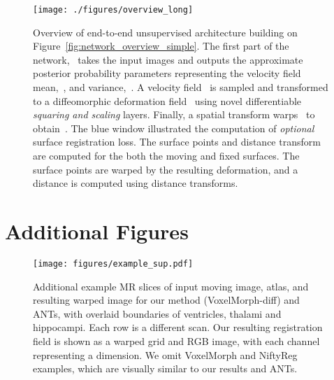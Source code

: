 \documentclass{article}
\begin{document}
\begin{figure*}[h!]
	\centering
	\begin{center}
		\texttt{[image: ./figures/overview\_long]}
	\end{center}
	\hfill
	\vspace{-0.75cm}
	\begin{minipage}[b]{1\linewidth}
		\caption{ Overview of end-to-end unsupervised architecture building on Figure~\ref{fig:network_overview_simple}. The first part of the network,~ takes the input images and outputs the approximate posterior probability parameters representing the velocity field mean,~, and variance,~. A velocity field~ is sampled and transformed to a diffeomorphic deformation field~ using novel differentiable \textit{squaring and scaling} layers. Finally, a spatial transform warps~ to obtain~. The blue window illustrated the computation of \textit{optional} surface registration loss. The surface points and distance transform are computed for the both the moving and fixed surfaces. The surface points are warped by the resulting deformation, and a distance is computed using distance transforms.
		}
		\label{fig:sup:network_overview_simple}
	\end{minipage}
\end{figure*}






\clearpage
\twocolumn

\section*{Additional Figures}





\begin{figure}[h!]
\begin{center}
		\texttt{[image: figures/example\_sup.pdf]}
	\end{center}
	\caption{Additional example MR slices of input moving image, atlas, and resulting warped image for our method (VoxelMorph-diff) and ANTs, with overlaid boundaries of ventricles, thalami and hippocampi. Each row is a different scan. Our resulting registration field is shown as a warped grid and RGB image, with each channel representing a dimension. We omit VoxelMorph and NiftyReg examples, which are visually similar to our results and ANTs. 
	}
	\label{fig:sup:reg_examples}
\end{figure}
\end{document}
